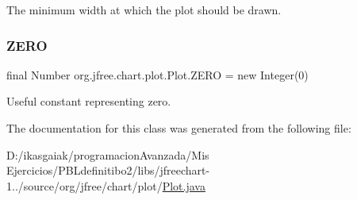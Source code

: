 The minimum width at which the plot should be drawn. \mbox{\label{classorg_1_1jfree_1_1chart_1_1plot_1_1_plot_acf5c7736aa5a5e494ef7518dcb8d2555}} 
\subsubsection{\texorpdfstring{Z\+E\+RO}{ZERO}}
{\footnotesize\ttfamily final Number org.\+jfree.\+chart.\+plot.\+Plot.\+Z\+E\+RO = new Integer(0)\hspace{0.3cm}{\ttfamily [static]}}

Useful constant representing zero. 

The documentation for this class was generated from the following file\+:\begin{DoxyCompactItemize}
\item 
D\+:/ikasgaiak/programacion\+Avanzada/\+Mis Ejercicios/\+P\+B\+Ldefinitibo2/libs/jfreechart-\/1../source/org/jfree/chart/plot/\mbox{\hyperlink{_plot_8java}{Plot.\+java}}\end{DoxyCompactItemize}
